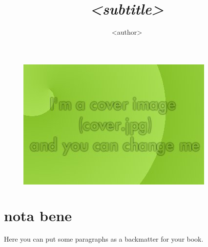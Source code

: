 \documentclass[a4paper,oneside,20pt]{book}
\author{\Huge <author>}
\title{
\brownit{\gargantuan {\upshape \textbf{<title>}}} \\
\emph {<subtitle>}
}
\date{} %
\begin{document}
 
\frontmatter
\begin{figure}[h] 
\centering 
\maketitle 
\includegraphics{cover.jpg} 
\vspace{2cm}
\end{figure}

\tableofcontents
\label{toc}
\pagestyle{fancy} 

\newpage

\mainmatter 



\backmatter
\chapter*{nota bene}
Here you can put some paragraphs as a backmatter for your book.
\printindex
\label{ind}
\end{document}
